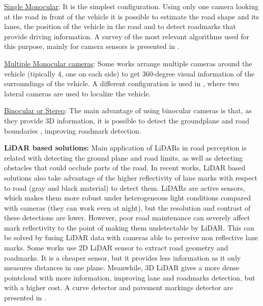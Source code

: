 \underline{Single Monocular}:
It is the simplest configuration. Using only one 
camera looking at the road in front of the vehicle it is possible to estimate 
the road shape and its lanes, the position of the vehicle in the road and to 
detect roadmarks  that provide driving information. A survey of the most 
relevant algorithms used for this purpose, mainly for camera sensors is 
presented in \cite{hillel2014recent}.

\underline{Multiple Monocular cameras}: 
Some works \cite{lee2017avm, kum2013lane} arrange multiple cameras 
around the vehicle (tipically 4, one on each side) to get 360-degree 
visual information of the surroundings of the vehicle. 
A different configuration is used in \cite{Ieng2003}, where two lateral cameras
are used to localize the vehicle. 

\underline{Binocular or Stereo}: 
The main advantage of using binocular cameras is that, as they provide 3D 
information, it is possible to detect the groundplane and road boundaries 
\cite{schreiber2013laneloc, ozgunalp2017multiple}, improving roadmark 
detection. 

\textbf{LiDAR based solutions:}
Main application of LiDARs in road perception is related with detecting the 
ground plane and road limits, as well as detecting obstacles that could occlude 
parts of the road.
In recent works, LiDAR based solutions also take advantage of the higher 
reflectivity of lane marks with respect to road (gray and black material) to 
detect them. 
LiDARs are active sensors, which makes them more robust under heterogeneous 
light conditions compared with cameras (they can work even at night), but the 
resolution and contrast of these detections are lower.
However, poor road maintenance can severely affect mark reflectivity to the 
point of making them undetectable by LiDAR. This can be solved by fusing LiDAR 
data with cameras able to perceive non reflective lane marks.
Some works \cite{nie2012camera, kim2015lane, lee2017avm} use 2D LiDAR sensor to
extract road geometry and roadmarks. 
It is a cheaper sensor, but it provides less information as it only measures 
distances in one plane.
Meanwhile, 3D LiDAR gives a more dense pointcloud with more information, 
improving lane and roadmarks detection, but with a higher cost. A curve 
detector and pavement markings detector are presented in 
\cite{yang2012automated, zhao2012curb, li2013new, Zhang2016}.

